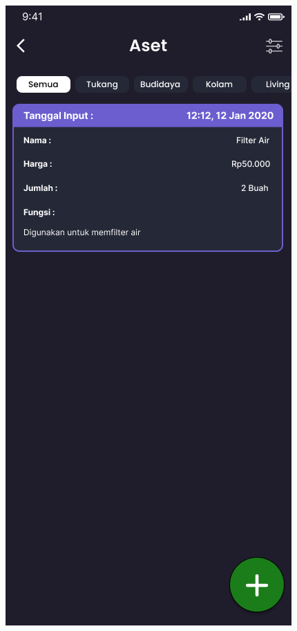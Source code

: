 \begin{enumerate}
\begin{enumerate}
		\begin{figure}[H]
			  \includegraphics[width=\linewidth]{gambar/sprint1/mockup_list_aset.png}

\end{figure}
\end{enumerate}
\end{enumerate}
